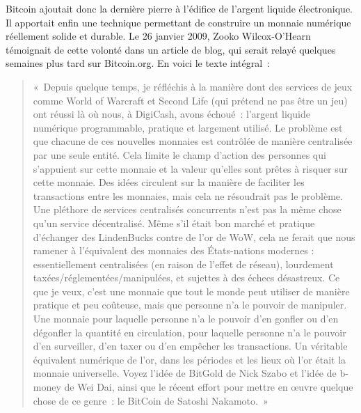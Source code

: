 Bitcoin ajoutait donc la dernière pierre à l'édifice de l'argent liquide électronique. Il apportait enfin une technique permettant de construire un monnaie numérique réellement solide et durable. Le 26 janvier 2009, Zooko Wilcox-O'Hearn témoignait de cette volonté dans un article de blog, qui serait relayé quelques semaines plus tard sur Bitcoin.org. En voici le texte intégral~:

\begin{quote}
«~Depuis quelque temps, je réfléchis à la manière dont des services de jeux comme World of Warcraft et Second Life (qui prétend ne pas être un jeu) ont réussi là où nous, à DigiCash, avons échoué~: l'argent liquide numérique programmable, pratique et largement utilisé. Le problème est que chacune de ces nouvelles monnaies est contrôlée de manière centralisée par une seule entité. Cela limite le champ d'action des personnes qui s'appuient sur cette monnaie et la valeur qu'elles sont prêtes à risquer sur cette monnaie. Des idées circulent sur la manière de faciliter les transactions entre les monnaies, mais cela ne résoudrait pas le problème. Une pléthore de services centralisés concurrents n'est pas la même chose qu'un service décentralisé. Même s'il était bon marché et pratique d'échanger des LindenBucks contre de l'or de WoW, cela ne ferait que nous ramener à l'équivalent des monnaies des États-nations modernes : essentiellement centralisées (en raison de l'effet de réseau), lourdement taxées/réglementées/manipulées, et sujettes à des échecs désastreux. Ce que je veux, c'est une monnaie que tout le monde peut utiliser de manière pratique et peu coûteuse, mais que personne n'a le pouvoir de manipuler. Une monnaie pour laquelle personne n'a le pouvoir d'en gonfler ou d'en dégonfler la quantité en circulation, pour laquelle personne n'a le pouvoir d'en surveiller, d'en taxer ou d'en empêcher les transactions. Un véritable équivalent numérique de l'or, dans les périodes et les lieux où l'or était la monnaie universelle. Voyez l'idée de BitGold de Nick Szabo et l'idée de b-money de Wei Dai, ainsi que le récent effort pour mettre en œuvre quelque chose de ce genre~: le BitCoin de Satoshi Nakamoto.~»

\end{quote}
